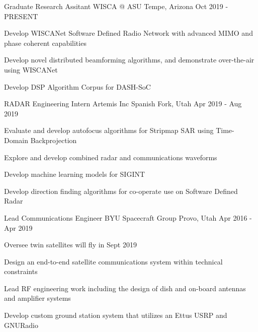 

\begin{cventries}
    \cventry
    {Graduate Research Assitant} %
    {WISCA @ ASU} %
    {Tempe, Arizona} %
    {Oct 2019 - PRESENT} %
    {
        \begin{cvitems} %
        \item {Develop WISCANet Software Defined Radio Network with advanced MIMO and phase coherent capabilities}
        \item {Develop novel distributed beamforming algorithms, and demonstrate over-the-air using WISCANet}
        \item {Develop DSP Algorithm Corpus for DASH-SoC}
        \end{cvitems}
    }

    \cventry
    {RADAR Engineering Intern} %
    {Artemis Inc} %
    {Spanish Fork, Utah} %
    {Apr 2019 - Aug 2019} %
    {
        \begin{cvitems} %
        \item {Evaluate and develop autofocus algorithms for Stripmap SAR using Time-Domain Backprojection}
        \item {Explore and develop combined radar and communications waveforms}
        \item {Develop machine learning models for SIGINT}
        \item {Develop direction finding algorithms for co-operate use on Software Defined Radar}
        \end{cvitems}
    }

    \cventry
    {Lead Communications Engineer} %
    {BYU Spacecraft Group} %
    {Provo, Utah} %
    {Apr 2016 - Apr 2019} %
    {
        \begin{cvitems} %
        \item {Oversee twin satellites will fly in Sept 2019}
        \item {Design an end-to-end satellite communications system within technical constraints}
        \item {Lead RF engineering work including the design of dish and on-board antennas and amplifier systems}
        \item {Develop custom ground station system that utilizes an Ettus USRP and GNURadio}
        \end{cvitems}
    }


\end{cventries}
